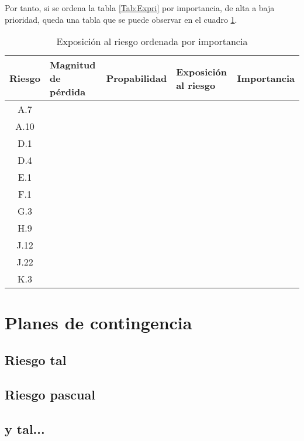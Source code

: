\documentclass[11pt,a4paper,spanish,twoside]{report}
\begin{document}
Por tanto, si se ordena la tabla \ref{Tab:Expri} por importancia, de alta a
baja prioridad, queda una tabla que se puede observar en el cuadro
\ref{Tab:Expor}.


\begin{table}[!h]
  \centering
  \begin{tabular}{|c||p{}||c||p{}||c|}
    \hline
    \textbf{Riesgo} & \textbf{Magnitud de pérdida} & \textbf{Propabilidad} & 
    \textbf{Exposición al riesgo} & \textbf{Importancia} \\
    \hline \hline
    A.7 &  &  &  &  \\ 
    \hline
    A.10 &  &  &  &  \\
    \hline 
    D.1 &  &  &  &  \\
    \hline
    D.4 &  &  &  &  \\
    \hline
    E.1 &  &  &  &  \\
    \hline
    F.1 &  &  &  &  \\
    \hline
    G.3 &  &  &  &  \\
    \hline
    H.9 &  &  &  &  \\
    \hline
    J.12 &  &  &  &  \\
    \hline
    J.22 &  &  &  &  \\
    \hline
    K.3 &  &  &  &  \\
    \hline
  \end{tabular}
  \caption{Exposición al riesgo ordenada por importancia} 
  \label{Tab:Expor}
\end{table}
\chapter{Planes de contingencia}
\section{Riesgo tal}

\section{Riesgo pascual}

\section{y tal...}
\end{document}
